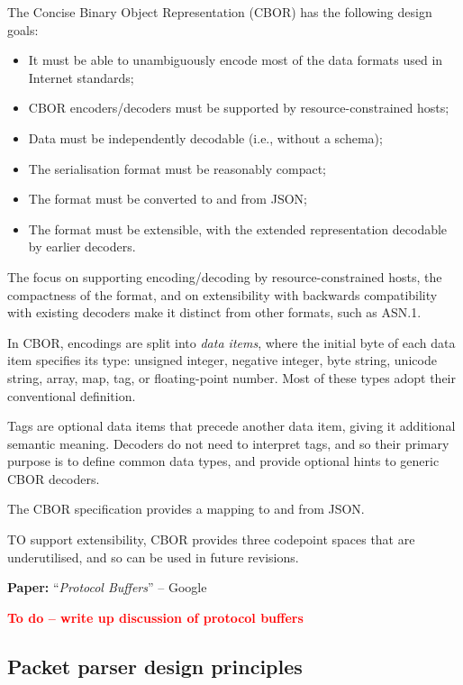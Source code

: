 \documentclass[10pt,a4paper]{article}
\newcommand{\todo}[1]{\textbf{\textcolor{red}{To do -- #1}}}
\newcommand{\paper}[3]{\vspace{4mm}\noindent\textbf{Paper:} ``\textit{#1}'' -- #2 \cite{#3}\vspace{3mm}}
\begin{document}
The Concise Binary Object Representation (CBOR) has the following design goals:
\begin{itemize}
	\item It must be able to unambiguously encode most of the data formats used in Internet
	      standards;
	\item CBOR encoders/decoders must be supported by resource-constrained hosts;
	\item Data must be independently decodable (i.e., without a schema);
	\item The serialisation format must be reasonably compact;
	\item The format must be converted to and from JSON;
	\item The format must be extensible, with the extended representation decodable by
	      earlier decoders.
\end{itemize}
    
The focus on supporting encoding/decoding by resource-constrained hosts, the compactness 
of the format, and on extensibility with backwards compatibility with existing decoders
make it distinct from other formats, such as ASN.1.

In CBOR, encodings are split into \emph{data items}, where the initial byte of each data
item specifies its type: unsigned integer, negative integer, byte string, unicode string,
array, map, tag, or floating-point number. Most of these types adopt their conventional
definition. 

Tags are optional data items that precede another data item, giving it additional semantic
meaning. Decoders do not need to interpret tags, and so their primary purpose is to define
common data types, and provide optional hints to generic CBOR decoders. 

The CBOR specification provides a mapping to and from JSON.

TO support extensibility, CBOR provides three codepoint spaces that are underutilised, and
so can be used in future revisions.

\paper{Protocol Buffers}{Google}{protocol-buffers}

\todo{write up discussion of protocol buffers}

\subsection{Packet parser design principles}
\end{document}
